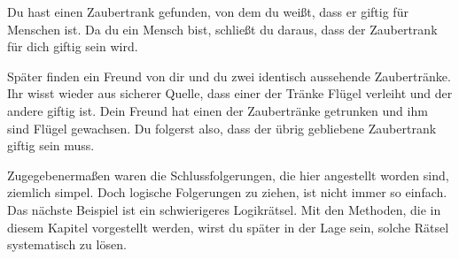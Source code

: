 \documentclass[../../main.tex]{subfiles}
\begin{document}
    
    \begin{example}
        Du hast einen Zaubertrank gefunden, von dem du weißt, dass er giftig für Menschen ist. Da du ein Mensch bist, schließt du daraus, dass der Zaubertrank für dich giftig sein wird.
        
        Später finden ein Freund von dir und du zwei identisch aussehende Zaubertränke. Ihr wisst wieder aus sicherer Quelle, dass einer der Tränke Flügel verleiht und der andere giftig ist. Dein Freund hat einen der Zaubertränke getrunken und ihm sind Flügel gewachsen. Du folgerst also, dass der übrig gebliebene Zaubertrank giftig sein muss.
    \end{example}
    

    Zugegebenermaßen waren die Schlussfolgerungen, die hier angestellt worden sind, ziemlich simpel. Doch logische Folgerungen zu ziehen, ist nicht immer so einfach. Das nächste Beispiel ist ein schwierigeres Logikrätsel. Mit den Methoden, die in diesem Kapitel vorgestellt werden, wirst du später in der Lage sein, solche Rätsel systematisch zu lösen.
    
\end{document}
